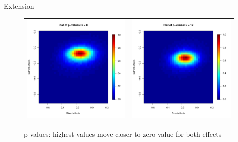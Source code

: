 \documentclass[final]{beamer}
\newlength{\onecolwid}
\newlength{\onecolwidd}
\begin{document}
\begin{frame}[t]
\begin{columns}[t]
\begin{column}{\onecolwidd}
\begin{block}{Extension}
\begin{rmfamily}
\begin{figure}
\begin{tabular}{cc}
	\includegraphics[scale=0.7]{pvalues_figure_8nn.pdf} &
	\includegraphics[scale=0.7]{pvalues_figure_12nn.pdf} \\ 
	\end{tabular}
	\caption{p-values: highest values move closer to zero value for both effects}
	\end{figure}
	

\end{rmfamily}
\end{block}
\end{column}
\end{columns}
\end{frame}
\end{document}
